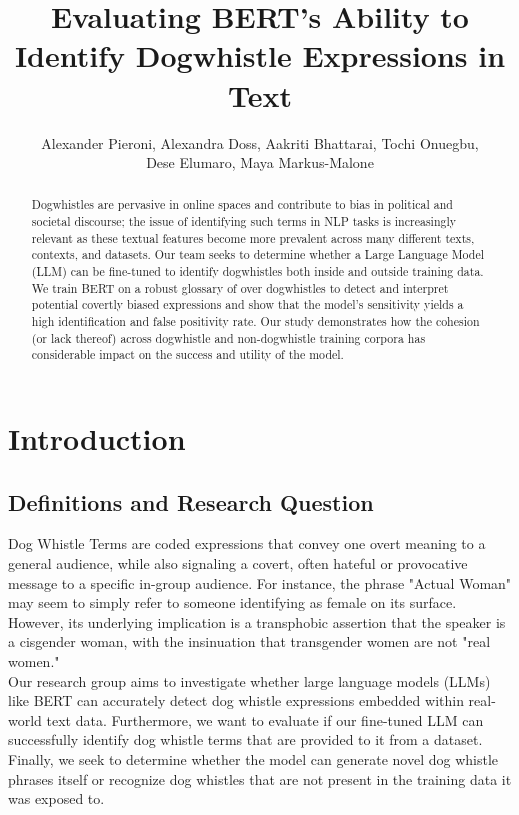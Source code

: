 \documentclass[11pt,a4paper]{article}
\title{Evaluating BERT’s Ability to Identify Dogwhistle Expressions in Text}
\author{Alexander Pieroni, Alexandra Doss, Aakriti Bhattarai, Tochi Onuegbu, \\ Dese Elumaro, Maya Markus-Malone}
\date{}
\begin{document}
\maketitle

\begin{abstract}
Dogwhistles are pervasive in online spaces and contribute to bias in political and societal discourse; the issue of identifying such terms in NLP tasks is increasingly relevant as these textual features become more prevalent across many different texts, contexts, and datasets. Our team seeks to determine whether a Large Language Model (LLM) can be fine-tuned to identify dogwhistles both inside and outside training data. We train BERT on a robust glossary of over dogwhistles to detect and interpret potential covertly biased expressions and show that the model's sensitivity yields a high identification and false positivity rate. Our study demonstrates how the cohesion (or lack thereof) across dogwhistle and non-dogwhistle training corpora has considerable impact on the success and utility of the model.
\end{abstract}

\section{Introduction}
\subsection{Definitions and Research Question}
Dog Whistle Terms are coded expressions that convey one overt meaning to a general audience, while also signaling a covert, often hateful or provocative message to a specific in-group audience. For instance, the phrase "Actual Woman" may seem to simply refer to someone identifying as female on its surface. However, its underlying implication is a transphobic assertion that the speaker is a cisgender woman, with the insinuation that transgender women are not "real women." \\
	Our research group aims to investigate whether large language models (LLMs) like BERT can accurately detect dog whistle expressions embedded within real-world text data. Furthermore, we want to evaluate if our fine-tuned LLM can successfully identify dog whistle terms that are provided to it from a dataset. Finally, we seek to determine whether the model can generate novel dog whistle phrases itself or recognize dog whistles that are not present in the training data it was exposed to.
\end{document}
